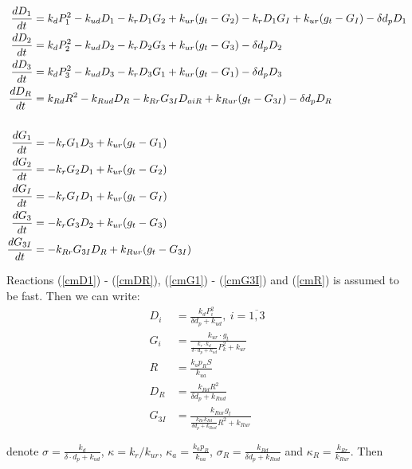 \documentclass[12pt]{article}
\begin{document}
	\begin{align}
	\label{cmD1}
	\frac{dD_{1}}{dt} & = k_{d} P_{1}^2 - k_{ud} D_{1} - k_{r} D_{1} G_{2} + k_{ur}(g_{t} - G_{2}) - k_{r} D_{1} G_{I} + k_{ur}(g_{t} - G_{I}) - \delta d_p D_{1}\\
	\label{cmD2}
	\frac{dD_{2}}{dt} & = k_{d} P_{2}^2 - k_{ud} D_{2} - k_{r} D_{2} G_{3} + k_{ur}(g_{t} - G_{3}) - \delta d_p D_{2}\\
	\label{cmD3}
	\frac{dD_{3}}{dt} & = k_{d} P_{3}^2 - k_{ud} D_{3} - k_{r} D_{3} G_{1} + k_{ur}(g_{t} - G_{1}) - \delta d_p D_{3}\\
	\label{cmDR}
	\frac{dD_{R}}{dt} & = k_{Rd} R^2 - k_{Rud} D_{R} - k_{Rr} G_{3I} D_{aiR} + k_{Rur}(g_{t} - G_{3I}) - \delta d_p D_{R}\\
	\notag\\
	\label{cmG1}
	\frac{dG_{1}}{dt} & = - k_{r} G_{1} D_{3} + k_{ur}(g_{t} - G_{1}) \\
	\label{cmG2}
	\frac{dG_{2}}{dt} & = - k_{r} G_{2} D_{1} + k_{ur}(g_{t} - G_{2}) \\
	\label{cmGI}
	\frac{dG_{I}}{dt} & = - k_{r} G_{I} D_{1} + k_{ur}(g_{t} - G_{I}) \\
	\label{cmG3}
	\frac{dG_{3}}{dt} & = - k_{r} G_{3} D_{2} + k_{ur}(g_{t} - G_{3}) \\
	\label{cmG3I}
	\frac{dG_{3I}}{dt} & = - k_{Rr} G_{3I} D_{R} + k_{Rur}(g_{t} - G_{3I})
\end{align}

Reactions (\ref{cmD1}) - (\ref{cmDR}), (\ref{cmG1}) - (\ref{cmG3I}) and (\ref{cmR}) is assumed to be fast. Then we can write:
\begin{align}
	\label{vcDiDim}
	D_{i} &= \frac{k_d P_i^2}{\delta d_p + k_{ud}}, \ i = \overline{1,3} \\
	\label{vcGiDim}
	G_{i} & = \frac{k_{ur} \cdot g_t}{\frac{k_r \cdot k_d}{\delta \cdot d_p + k_{ud}} P_k^2 + k_{ur}}\\
	\label{vcRDim}
	R &= \frac{k_a p_R S}{k_{ua}} \\
	\label{vcDRDim}
	D_{R} &= \frac{k_{Rd} R^2}{\delta d_p + k_{Rud}} \\
	\label{vcDR}
	G_{3I} &= \frac{k_{Rur} g_t}{\frac{k_{Rr} k_{Rd}}{\delta d_p + k_{Rud}} R^2 + k_{Rur}}
\end{align}

denote $\sigma = \frac{ k_d}{\delta \cdot d_p + k_{ud}}$, $ \kappa = k_r / k_{ur} $, $\kappa_{a} = \frac{k_a p_R}{k_{ua}}$, $\sigma_R = \frac{k_{Rd}}{\delta d_p + k_{Rud}}$ and $\kappa_R = \frac{k_{Rr}}{k_{Rur}}$. Then
\end{document}
